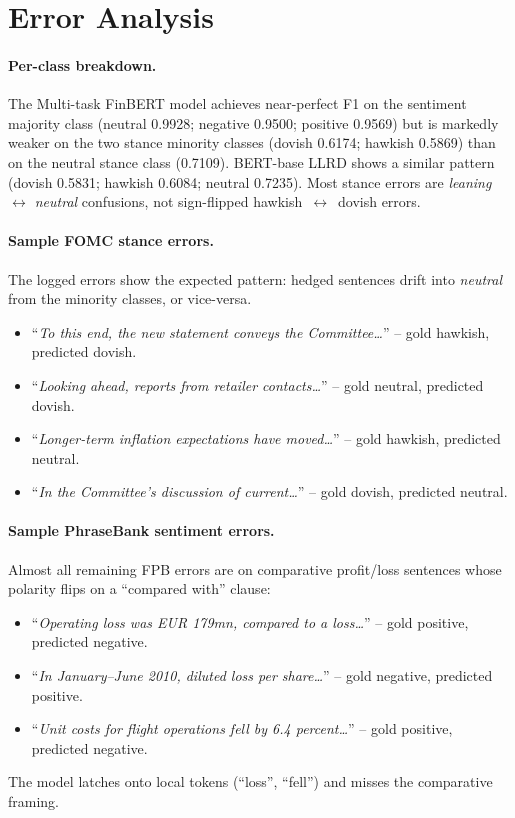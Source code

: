 \documentclass[conference, 10pt, twocolumn]{IEEEtran}
\begin{document}
\section{Error Analysis}
\label{sec:errors}

\paragraph{Per-class breakdown.} The Multi-task FinBERT model achieves
near-perfect F1 on the sentiment majority class (neutral 0.9928; negative
0.9500; positive 0.9569) but is markedly weaker on the two stance minority
classes (dovish 0.6174; hawkish 0.5869) than on the neutral stance class
(0.7109). BERT-base LLRD shows a similar pattern (dovish 0.5831; hawkish
0.6084; neutral 0.7235). Most stance errors are \emph{leaning~$\leftrightarrow$
neutral} confusions, not sign-flipped hawkish~$\leftrightarrow$~dovish
errors.

\paragraph{Sample FOMC stance errors.} The logged errors show the expected
pattern: hedged sentences drift into \emph{neutral} from the minority
classes, or vice-versa.
\begin{itemize}[leftmargin=1.1em,itemsep=0.1em,topsep=0.2em]
    \item ``\emph{To this end, the new statement conveys the Committee\ldots}''
          -- gold hawkish, predicted dovish.
    \item ``\emph{Looking ahead, reports from retailer contacts\ldots}''
          -- gold neutral, predicted dovish.
    \item ``\emph{Longer-term inflation expectations have moved\ldots}''
          -- gold hawkish, predicted neutral.
    \item ``\emph{In the Committee's discussion of current\ldots}''
          -- gold dovish, predicted neutral.
\end{itemize}

\paragraph{Sample PhraseBank sentiment errors.} Almost all remaining FPB
errors are on comparative profit/loss sentences whose polarity flips on a
``compared with'' clause:
\begin{itemize}[leftmargin=1.1em,itemsep=0.1em,topsep=0.2em]
    \item ``\emph{Operating loss was EUR 179mn, compared to a loss\ldots}''
          -- gold positive, predicted negative.
    \item ``\emph{In January--June 2010, diluted loss per share\ldots}''
          -- gold negative, predicted positive.
    \item ``\emph{Unit costs for flight operations fell by 6.4 percent\ldots}''
          -- gold positive, predicted negative.
\end{itemize}
The model latches onto local tokens (``loss'', ``fell'') and misses the
comparative framing.
\end{document}
